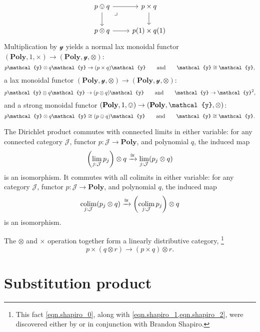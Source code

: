 \documentclass[11pt, one side, article]{memoir}
\theoremstyle{definition}
\theoremstyle{plain}
\DeclareMathOperator*{\colim}{colim}
\newcommand{\cat}[1]{\mathcal{#1}}%
\newcommand{\Cat}[1]{\mathbf{#1}}%
\newcommand{\To}[2][]{\xrightarrow[#1]{\tn{$#2$}}}
\newcommand{\tn}[1]{\textnormal{#1}}
\newcommand{\yon}{{\mathcal{y}}}
\newcommand{\poly}{\Cat{Poly}}
\newcommand{\0}{\textsf{0}}
\newcommand{\1}{\tn{\textsf{1}}}
\newcommand{\hh}[2][]{#1 \tn{#2} #1}
\newcommand{\qqand}{\hh[\qquad]{and}}
\begin{document}
\begin{equation}
\begin{tikzcd}
	p\ovee q\ar[r]\ar[d]&
	p\times q\ar[d]\\
	p\otimes q\ar[r]&
	p(1)\times q(1)\ar[ul, phantom, very near end, "\lrcorner"]
\end{tikzcd}
\end{equation}
Multiplication by $\yon$ yields a normal lax monoidal functor $(\poly,1,\times)\to(\poly,\yon,\otimes)$: 
\begin{equation}\label{eqn.lax_times_tensor}
	p\yon\otimes q\yon\to (p\times q)\yon
	\qqand
	\yon\cong \yon,
\end{equation}
a lax monoidal functor $(\poly,\yon,\otimes)\to(\poly,\yon,\otimes)$:
\begin{equation}
	p\yon\otimes q\yon\to (p\otimes q)\yon
	\qqand
	\yon\to\yon^2,
\end{equation}
and a strong monoidal functor $(\poly,1,\ovee)\to(\poly,\yon,\otimes)$:
\begin{equation}
	p\yon\otimes q\yon\cong (p\ovee q)\yon
	\qqand
	\yon\cong \yon.
\end{equation}


The Dirichlet product commutes with connected limits in either variable: for any connected category $\cat{J}$, functor $p\colon\cat{J}\to\poly$, and polynomial $q$, the induced map
\begin{equation}
	\left(\lim_{j:\cat{J}}p_j\right)\otimes q
	\To{\cong}
	\lim_{j:\cat{J}}(p_j\otimes q)
\end{equation}
is an isomorphism. It commutes with all colimits in either variable: for any category $\cat{J}$, functor $p\colon\cat{J}\to\poly$, and polynomial $q$, the induced map
\begin{equation}
	\colim_{j:\cat{J}}(p_j\otimes q)
	\To{\cong}
	\left(\colim_{j:\cat{J}}p_j\right)\otimes q
\end{equation}
is an isomorphism.

The $\otimes$ and $\times$ operation together form a linearly distributive category,%
\footnote{This fact \eqref{eqn.shapiro_0}, along with \cref{eqn.shapiro_1,eqn.shapiro_2}, were discovered either by or in conjunction with Brandon Shapiro.}
\begin{equation}\label{eqn.shapiro_0}
p\times(q\otimes r)\to (p\times q)\otimes r.
\end{equation}

\chapter{Substitution product}
\end{document}
